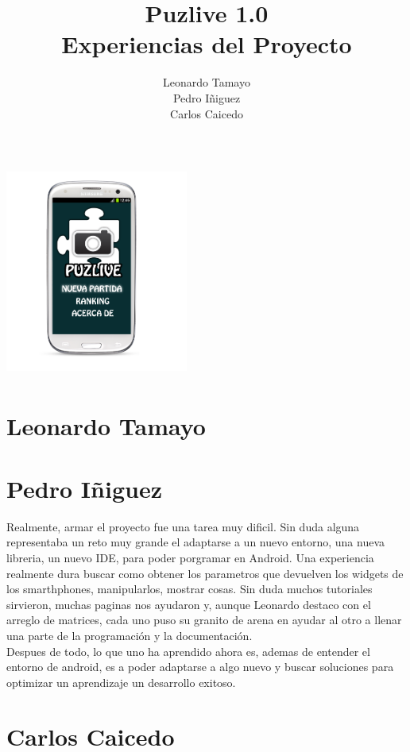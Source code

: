 \documentclass[10pt]{article}
\title{\bfseries\Huge Puzlive 1.0\\ Experiencias del Proyecto}
\author{Leonardo Tamayo \\Pedro Iñiguez \\Carlos Caicedo}
\date{}
\begin{document}
\begin{minipage}{0.65\textwidth}
\begingroup
\let\center\flushleft
\let\endcenter\endflushleft
\maketitle

\endgroup
\end{minipage}
\begin{minipage}{0.3\textwidth}

\includegraphics[height=7cm,width=6cm]{androidpro4.png}
\end{minipage}

\section{Leonardo Tamayo}


	
\section{Pedro Iñiguez}
Realmente, armar el proyecto fue una tarea muy dificil. Sin duda alguna representaba un reto muy grande el adaptarse a un nuevo entorno, una nueva libreria, un nuevo IDE, para
poder porgramar en Android. Una experiencia realmente dura buscar como obtener los parametros que devuelven los widgets de los smarthphones, manipularlos, mostrar cosas.
Sin duda muchos tutoriales sirvieron, muchas paginas nos ayudaron y, aunque Leonardo destaco con el arreglo de matrices, cada uno puso su granito de arena en ayudar al otro 
a llenar una parte de la programaci\'on y la documentaci\'on. \\Despues de todo, lo que uno ha aprendido ahora es, ademas de entender el entorno de android, es a poder adaptarse
a algo nuevo y buscar soluciones para optimizar un aprendizaje un desarrollo exitoso.
	

\section{Carlos Caicedo}
	
		
\end{document}
